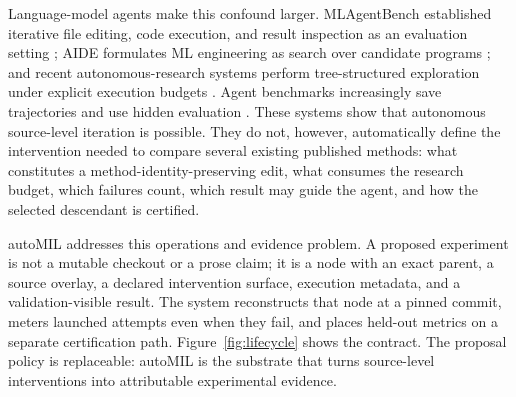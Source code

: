 \documentclass{article}
\newcommand{\ours}{\textsf{autoMIL}\xspace}
\begin{document}
Language-model agents make this confound larger.  MLAgentBench established
iterative file editing, code execution, and result inspection as an evaluation
setting \cite{huang2024mlagentbench}; AIDE formulates ML engineering as search
over candidate programs \cite{jiang2025aide}; and recent autonomous-research
systems perform tree-structured exploration under explicit execution budgets
\cite{yamada2025aiscientistv2,toledo2025aira,hambardzumyan2026aira2}.
Agent benchmarks increasingly save trajectories and use hidden evaluation
\cite{wijk2024rebench,zhang2025mlrcbench}.  These systems show that autonomous
source-level iteration is possible.  They do not, however, automatically
define the intervention needed to compare several existing published methods:
what constitutes a method-identity-preserving edit, what consumes the research budget,
which failures count, which result may guide the agent, and how the selected
descendant is certified.

\ours addresses this operations and evidence problem.  A proposed experiment
is not a mutable checkout or a prose claim; it is a node with an exact parent,
a source overlay, a declared intervention surface, execution metadata, and a
validation-visible result.  The system reconstructs that node at a pinned
commit, meters launched attempts even when they fail, and places held-out
metrics on a separate certification path.  Figure~\ref{fig:lifecycle} shows the
contract.  The proposal policy is replaceable: \ours is the substrate that
turns source-level interventions into attributable experimental evidence.
\end{document}
